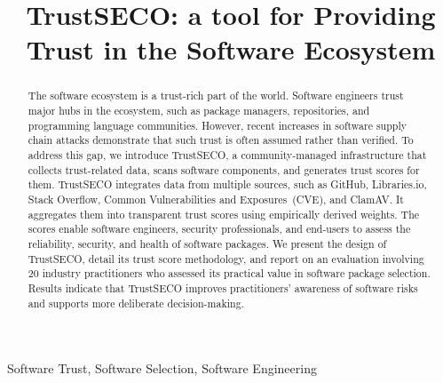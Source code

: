 \documentclass[10pt,conference]{IEEEtran}
\begin{document}
\title{TrustSECO: a tool for Providing Trust in the Software Ecosystem}
\author{}
\maketitle

\begin{abstract}


The software ecosystem is a trust-rich part of the world. Software engineers trust major hubs in the ecosystem, such as package managers, repositories, and programming language communities. However, recent increases in software supply chain attacks demonstrate that such trust is often assumed rather than verified. To address this gap, we introduce TrustSECO, a community-managed infrastructure that collects trust-related data, scans software components, and generates trust scores for them. TrustSECO integrates data from multiple sources, such as GitHub, Libraries.io, Stack Overflow, Common Vulnerabilities and Exposures~(CVE), and ClamAV. It aggregates them into transparent trust scores using empirically derived weights. The scores enable software engineers, security professionals, and end-users to assess the reliability, security, and health of software packages. We present the design of TrustSECO, detail its trust score methodology, and report on an evaluation involving 20 industry practitioners who assessed its practical value in software package selection. Results indicate that TrustSECO improves practitioners' awareness of software risks and supports more deliberate decision-making.


\end{abstract}
%
\begin{IEEEkeywords}
Software Trust, Software Selection, Software Engineering
\end{IEEEkeywords}







\end{document}
